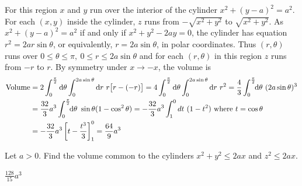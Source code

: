 \begin{solution}
For this region $x$ and $y$ run over the interior of the 
cylinder $x^2+(y-a)^2=a^2$. For each $(x,y)$ inside the 
cylinder, $z$ runs from $-\sqrt{x^2+y^2}$ to $\sqrt{x^2+y^2}$.
As $x^2+(y-a)^2=a^2$ if and only if $x^2+y^2-2ay=0$, the cylinder
has equation $r^2=2ar\sin\theta$, or equivalently, $r=2a\sin\theta$,
in polar coordinates. 
%
Thus $(r,\theta)$ runs over $0\le\theta\le\pi,\ 
0\le r\le 2a\sin\theta$ and for each $(r,\theta)$ in this region $z$ runs from
$-r$ to $r$. By symmetry under $x\rightarrow -x$,
the volume is
\begin{align*}
\text{Volume}
&=2\int_0^{{\pi\over 2}}\dee{\theta}\int_0^{2a\sin\theta}\dee{r}\  
                                             r\big[r-(-r)\big]
=4\int_0^{{\pi\over 2}}\dee{\theta}\int_0^{2a\sin\theta}\dee{r}\ r^2
=\frac{4}{3}\int_0^{{\pi\over 2}}\!\!\dee{\theta}\ (2a\sin\theta)^3 \\
&=\frac{32}{3}a^3\int_0^{{\pi\over 2}}\!\!\dee{\theta}\ \sin\theta(1-\cos^2\theta)
=-\frac{32}{3}a^3\int_1^0 dt\ (1-t^2)\text{ where $t=\cos\theta$ }\cr
&=-\frac{32}{3}a^3\left[t-\frac{t^3}{3}\right]_1^0
=\frac{64}{9}a^3
\end{align*}
\end{solution}

\begin{question}
Let $a>0$.
Find the volume common to the cylinders $x^2+y^2\le 2ax$ and 
$z^2\le 2ax$.
\end{question}

%

\begin{answer}
$\frac{128}{15}a^3$
\end{answer}


